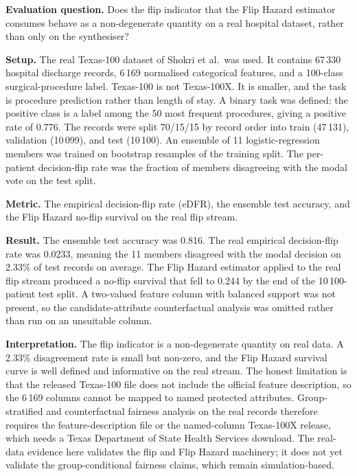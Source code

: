 \documentclass[acmsmall,nonacm,review,anonymous]{acmart}
\newcommand{\1}[1]{\mathbf{1}\!\left\{#1\right\}}
\begin{document}
\textbf{Evaluation question.}
Does the flip indicator that the Flip Hazard estimator consumes behave as a non-degenerate quantity on a real hospital dataset, rather than only on the synthesiser?

\textbf{Setup.}
The real Texas-100 dataset of Shokri et al.\ was used. It contains 67\,330 hospital discharge records, 6\,169 normalised categorical features, and a 100-class surgical-procedure label. Texas-100 is not Texas-100X. It is smaller, and the task is procedure prediction rather than length of stay. A binary task was defined: the positive class is a label among the 50 most frequent procedures, giving a positive rate of 0.776. The records were split 70/15/15 by record order into train (47\,131), validation (10\,099), and test (10\,100). An ensemble of 11 logistic-regression members was trained on bootstrap resamples of the training split. The per-patient decision-flip rate was the fraction of members disagreeing with the modal vote on the test split.

\textbf{Metric.}
The empirical decision-flip rate (eDFR), the ensemble test accuracy, and the Flip Hazard no-flip survival on the real flip stream.

\textbf{Result.}
The ensemble test accuracy was 0.816. The real empirical decision-flip rate was 0.0233, meaning the 11 members disagreed with the modal decision on 2.33\% of test records on average. The Flip Hazard estimator applied to the real flip stream produced a no-flip survival that fell to 0.244 by the end of the 10\,100-patient test split. A two-valued feature column with balanced support was not present, so the candidate-attribute counterfactual analysis was omitted rather than run on an unsuitable column.

\textbf{Interpretation.}
The flip indicator is a non-degenerate quantity on real data. A 2.33\% disagreement rate is small but non-zero, and the Flip Hazard survival curve is well defined and informative on the real stream. The honest limitation is that the released Texas-100 file does not include the official feature description, so the 6\,169 columns cannot be mapped to named protected attributes. Group-stratified and counterfactual fairness analysis on the real records therefore requires the feature-description file or the named-column Texas-100X release, which needs a Texas Department of State Health Services download. The real-data evidence here validates the flip and Flip Hazard machinery; it does not yet validate the group-conditional fairness claims, which remain simulation-based.
\end{document}

